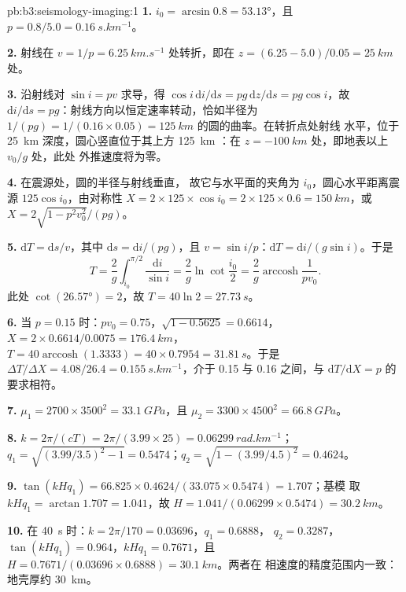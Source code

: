 \begin{solution}{pb:b3:seismology-imaging:1}
\textbf{1.} $i_0 = \arcsin 0.8 = \ang{53.13}$，且 $p = 0.8/5.0 =
\qty{0.16}{s.km^{-1}}$。

\textbf{2.} 射线在 $v = 1/p = \qty{6.25}{km.s^{-1}}$ 处转折，即在
$z = (6.25 - 5.0)/0.05 = \qty{25}{km}$ 处。

\textbf{3.} 沿射线对 $\sin i = pv$ 求导，得 $\cos i\,\mathrm di/
\mathrm ds = pg\,\mathrm dz/\mathrm ds = pg\cos i$，故 $\mathrm di/\mathrm ds =
pg$：射线方向以恒定速率转动，恰如半径为
$1/(pg) = 1/(0.16\times0.05) = \qty{125}{km}$ 的圆的曲率。在转折点处射线
水平，位于 \qty{25}{km} 深度，圆心竖直位于其上方 \qty{125}{km}
：在 $z = \qty{-100}{km}$ 处，即地表以上 $v_0/g$ 处，此处
外推速度将为零。

\textbf{4.} 在震源处，圆的半径与射线垂直，
故它与水平面的夹角为 $i_0$，圆心水平距离震源
$125\cos i_0$，由对称性
$X = 2\times125\times\cos i_0 = 2\times125\times0.6 = \qty{150}{km}$，或
$X = 2\sqrt{1 - p^2v_0^2}/(pg)$。

\textbf{5.} $\mathrm dT = \mathrm ds/v$，其中 $\mathrm ds = \mathrm di/(pg)$，且
$v = \sin i/p$：$\mathrm dT = \mathrm di/(g\sin i)$。于是
\[
  T = \frac2g\int_{i_0}^{\pi/2}\frac{\mathrm di}{\sin i} = \frac2g\ln\cot\frac{i_0}2 =
  \frac2g\operatorname{arccosh}\frac1{pv_0} .
\]
此处 $\cot(\ang{26.57}) = 2$，故
$T = 40\ln2 = \qty{27.73}{s}$。

\textbf{6.} 当 $p = 0.15$ 时：$pv_0 = 0.75$，$\sqrt{1 - 0.5625} = 0.6614$，
$X = 2\times0.6614/0.0075 = \qty{176.4}{km}$，$T = 40\operatorname{arccosh}
(1.3333) = 40\times0.7954 = \qty{31.81}{s}$。于是 $\Delta T/\Delta X =
4.08/26.4 = \qty{0.155}{s.km^{-1}}$，介于 0.15 与 0.16 之间，与
$\mathrm dT/\mathrm dX = p$ 的要求相符。

\textbf{7.} $\mu_1 = 2700\times3500^2 = \qty{33.1}{GPa}$，且
$\mu_2 = 3300\times4500^2 = \qty{66.8}{GPa}$。

\textbf{8.} $k = 2\pi/(cT) = 2\pi/(3.99\times25) = \qty{0.06299}{rad.km^{-1}}$；
$q_1 = \sqrt{(3.99/3.5)^2 - 1} = 0.5474$；$q_2 = \sqrt{1 - (3.99/4.5)^2} = 0.4624$。

\textbf{9.} $\tan(kHq_1) = 66.825\times0.4624/(33.075\times0.5474) = 1.707$；基模
取 $kHq_1 = \arctan1.707 = 1.041$，故
$H = 1.041/(0.06299\times0.5474) = \qty{30.2}{km}$。

\textbf{10.} 在 \qty{40}{s} 时：$k = 2\pi/170 = 0.03696$，$q_1 = 0.6888$，
$q_2 = 0.3287$，$\tan(kHq_1) = 0.964$，$kHq_1 = 0.7671$，且
$H = 0.7671/(0.03696\times0.6888) = \qty{30.1}{km}$。两者在
相速度的精度范围内一致：地壳厚约 \qty{30}{km}。


\end{solution}
